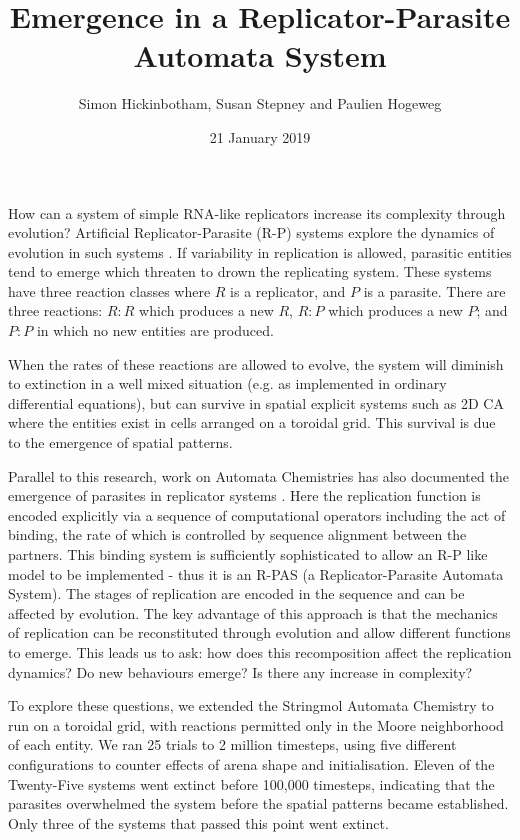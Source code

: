 \documentclass[twocolumn]{article}
\title{Emergence in a Replicator-Parasite Automata System}
\author{Simon Hickinbotham, Susan Stepney and Paulien Hogeweg}
\date{21 January 2019}
\begin{document}
\maketitle


How can a system of simple RNA-like replicators increase its complexity
through evolution? Artificial Replicator-Parasite (R-P) systems
explore the dynamics of evolution in such systems  \cite{ph1}.
If variability in replication is allowed, parasitic entities tend to
emerge which threaten to drown the replicating system. These
systems have three reaction classes where \(R\) is a replicator, and
\(P\) is a parasite. There are three reactions: \(R:R\) which produces a
new \(R\), \(R:P\) which produces a new \(P\); and \(P:P\) in which no
new entities are produced.

When the rates of these reactions are allowed to evolve, the system will diminish to extinction in a well mixed situation (e.g. as implemented in ordinary differential equations), but can survive in spatial explicit systems such as 2D  CA
 where the entities exist in cells arranged on a toroidal grid.
This survival is due to the emergence of spatial patterns.

Parallel to this research, work on Automata Chemistries has also
documented the emergence of parasites in replicator systems \cite{stringmol}. Here
the replication function is encoded explicitly via a sequence of
computational operators including the act of binding, the rate of which is controlled by sequence alignment between the partners. This binding system is sufficiently sophisticated to allow
an  R-P like model to be implemented - thus it is an R-PAS (a
Replicator-Parasite Automata System). The stages of replication are
encoded in the sequence and can be affected by evolution. The key
advantage of this approach is that the mechanics of replication can be
reconstituted through evolution and allow different functions to emerge.
This leads us to ask: how does this recomposition affect the
replication dynamics? Do new behaviours emerge? Is there any increase in
complexity?

To explore these questions, we extended the Stringmol Automata Chemistry to run on a toroidal
grid, with reactions permitted only in the Moore neighborhood of each entity. We ran 25
trials to 2 million timesteps, using five different configurations to
counter effects of arena shape and initialisation.
%
Eleven of the Twenty-Five systems went extinct
before 100,000 timesteps, indicating that the parasites overwhelmed the
system before the spatial patterns became established. Only three of the
systems that passed this point went extinct.
\end{document}
